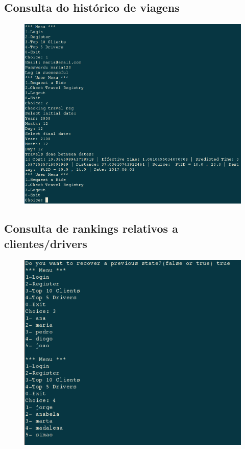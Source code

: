 \documentclass[a4paper,10pt,portuguese]{article}
\begin{document}
\subsection{Consulta do histórico de viagens}
\begin{figure}[ht!]
    \centering
    \includegraphics[width=120mm]{verViagens.png}
\end{figure}

\subsection{Consulta de rankings relativos a clientes/drivers}
\begin{figure}[ht!]
    \centering
    \includegraphics[width=120mm]{top5top10.png}
\end{figure}
\end{document}
